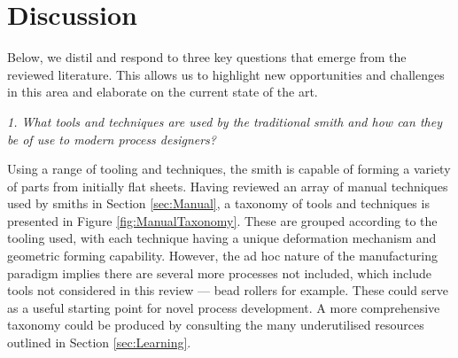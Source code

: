 



\section{Discussion}\label{sec:discussion}

Below, we distil and respond to three key questions that emerge from the reviewed literature. This allows us to highlight new opportunities and challenges in this area and elaborate on the current state of the art.

\newcommand{\question}[1]{\vspace{1em} \noindent \textit{#1} \vspace{0.5em}}

\question{1. What tools and techniques are used by the traditional smith and how can they be of use to modern process designers?}

Using a range of tooling and techniques, the smith is capable of forming a variety of parts from initially flat sheets. Having reviewed an array of manual techniques used by smiths in Section \ref{sec:Manual}, a taxonomy of tools and techniques is presented in Figure \ref{fig:ManualTaxonomy}. These are grouped according to the tooling used, with each technique having a unique deformation mechanism and geometric forming capability. However, the ad hoc nature of the manufacturing paradigm implies there are several more processes not included, which include tools not considered in this review --- bead rollers for example. These could serve as a useful starting point for novel process development. A more comprehensive taxonomy could be produced by consulting the many underutilised resources outlined in Section \ref{sec:Learning}.

